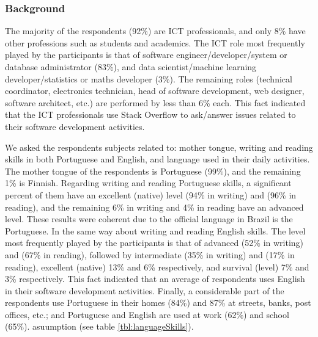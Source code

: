 \subsubsection{Background}
\noindent The majority of the respondents (92\%) are ICT professionals, and only 8\% have other professions such as students and academics. The ICT role most frequently played by the participants is that of software engineer/developer/system or database administrator (83\%), and data scientist/machine learning developer/statistics or maths developer (3\%). The remaining roles (technical coordinator, electronics technician, head of software development, web designer, software architect, etc.) are performed by less than 6\% each. This fact indicated that the ICT professionals use Stack Overflow to ask/answer issues related to their software development activities.

We asked the respondents subjects related to: mother tongue, writing and reading skills in both Portuguese and English, and language used in their daily activities. The mother tongue of the respondents is Portuguese (99\%), and the remaining 1\% is Finnish. Regarding writing and reading Portuguese skills, a significant percent of them have an excellent (native) level (94\% in writing) and (96\% in reading), and the remaining 6\% in writing and 4\% in reading have an advanced level. These results were coherent due to the official language in Brazil is the Portuguese. In the same way about writing and reading English skills. The level most frequently played by the participants is that of advanced (52\% in writing) and (67\% in reading), followed by intermediate (35\% in writing) and (17\% in reading), excellent (native) 13\% and 6\% respectively, and survival (level) 7\% and 3\% respectively. This fact indicated that an average of respondents uses English in their software development activities. Finally, a considerable part of the respondents use Portuguese in their homes (84\%) and 87\% at streets, banks, post offices, etc.; and Portuguese and English are used at work (62\%) and school (65\%).  asuumption (see table \ref{tbl:languageSkills}).

